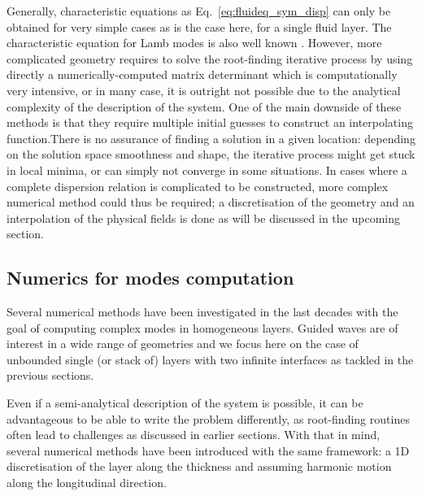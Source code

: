 Generally, characteristic equations as Eq.~\ref{eq:fluideq_sym_disp} can only be obtained for very simple cases as is the case here, for a single fluid layer. The characteristic equation for Lamb modes is also well known \cite{royer2021}. However, more complicated geometry requires to solve the root-finding iterative process by using directly a numerically-computed matrix determinant which is computationally very intensive, or in many case, it is outright not possible due to the analytical complexity of the description of the system. One of the main downside of these methods is that they require multiple initial guesses to construct an interpolating function.There is no assurance of finding a solution in a given location: depending on the solution space smoothness and shape, the iterative process might get stuck in local minima, or can simply not converge in some situations. In cases where a complete dispersion relation is complicated to be constructed, more complex numerical method could thus be required; a discretisation of the geometry and an interpolation of the physical fields is done as will be discussed in the upcoming section.

\subsection{Numerics for modes computation}
\label{ssec:numerics-layers}
Several numerical methods have been investigated in the last decades with the goal of computing complex modes in homogeneous layers. Guided waves are of interest in a wide range of geometries and we focus here on the case of unbounded single (or stack of) layers with two infinite interfaces as tackled in the previous sections. 

Even if a semi-analytical description of the system is possible, it can be advantageous to be able to write the problem differently, as root-finding routines often lead to challenges as discussed in earlier sections. With that in mind, several numerical methods have been introduced with the same framework: a 1D discretisation of the layer along the thickness and assuming harmonic motion along the longitudinal direction.

